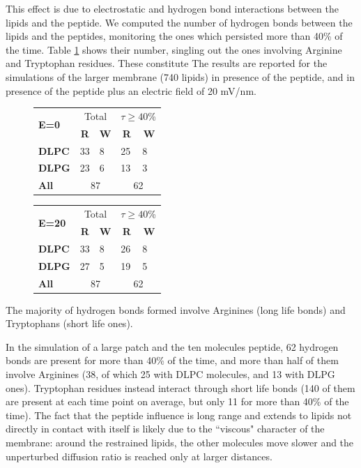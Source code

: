 This effect is due to electrostatic and hydrogen bond interactions between the lipids and the peptide. We computed the number of hydrogen bonds between the lipids and the peptides, monitoring the ones which persisted more than 40\% of the time. Table \ref{table:hb_pr_lip} shows their number, singling out the ones involving Arginine and Tryptophan residues.
%
These constitute
 The results are reported for the simulations of the larger membrane (740 lipids) in presence of the peptide, and in presence of the peptide plus an electric field of 20 mV/nm.
%
\begin{figure}[t]
\centering
 \def\arraystretch{1.7}
\begin{tabular}{l|ll|ll}
\multirow{2}{*}{\textbf{E=0}} & \multicolumn{2}{c|}{Total} & \multicolumn{2}{c}{$\displaystyle\tau \ge 40$\%} \\
 \cline{2-5}
  & \multicolumn{1}{c}{\textbf{R}} & \multicolumn{1}{c|}{\textbf{W}} & \multicolumn{1}{c}{\textbf{R}} & \multicolumn{1}{c}{\textbf{W}} \\
 \hline
 \textbf{DLPC} & 33 & 8 & 25 & 8 \\
 \textbf{DLPG} & 23 & 6 & 13 & 3 \\
 \hline
 \textbf{All} & \multicolumn{2}{c|}{87} & \multicolumn{2}{c}{62}
 \end{tabular}
 \hspace{0.4cm}
 \begin{tabular}{l|ll|ll}
\multirow{2}{*}{\textbf{E=20}} & \multicolumn{2}{c|}{Total} & \multicolumn{2}{c}{$\displaystyle\tau \ge 40$\%} \\
 \cline{2-5}
 & \multicolumn{1}{c}{\textbf{R}} & \multicolumn{1}{c|}{\textbf{W}} & \multicolumn{1}{c}{\textbf{R}} & \multicolumn{1}{c}{\textbf{W}} \\
 \hline
 \textbf{DLPC} & 33 & 8 & 26 & 8 \\
 \textbf{DLPG} & 27 & 5 & 19 & 5 \\
 \hline
 \textbf{All} & \multicolumn{2}{c|}{87} & \multicolumn{2}{c}{62}
 \end{tabular}
\label{table:hb_pr_lip}
\end{figure}




The majority of hydrogen bonds formed involve Arginines (long life bonds) and Tryptophans (short life ones). 





In the simulation of a large patch and the ten molecules peptide, 62 hydrogen bonds are present for more than 40\% of the time, and more than half of them involve Arginines (38, of which 25 with DLPC molecules, and 13 with DLPG ones). Tryptophan residues instead interact through short life bonds (140 of them are present at each time point on average, but only 11 for more than 40\% of the time).
%
The fact that the peptide influence is long range and extends to lipids not directly in contact with itself is likely due to the ``viscous" character of the membrane: around the restrained lipids, the other molecules move slower and the unperturbed diffusion ratio is reached only at larger distances.






